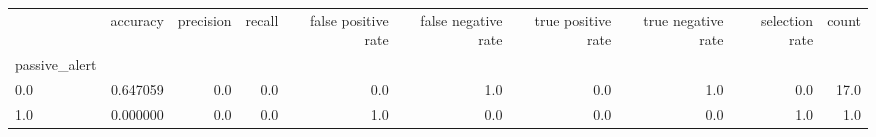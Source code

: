 \begin{tabular}{lrrrrrrrrr}
\toprule
{} &  accuracy &  precision &  recall &  false positive rate &  false negative rate &  true positive rate &  true negative rate &  selection rate &  count \\
passive\_alert &           &            &         &                      &                      &                     &                     &                 &        \\
\midrule
0.0           &  0.647059 &        0.0 &     0.0 &                  0.0 &                  1.0 &                 0.0 &                 1.0 &             0.0 &   17.0 \\
1.0           &  0.000000 &        0.0 &     0.0 &                  1.0 &                  0.0 &                 0.0 &                 0.0 &             1.0 &    1.0 \\
\bottomrule
\end{tabular}
